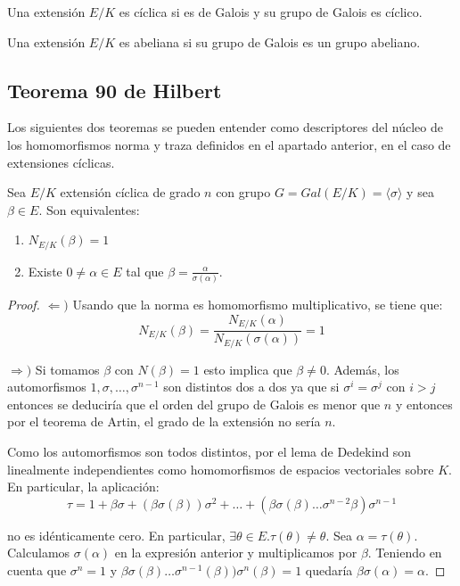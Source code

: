\begin{definition}
Una extensión $E/K$ es cíclica si es de Galois y su grupo de Galois es cíclico.

Una extensión $E/K$ es abeliana si su grupo de Galois es un grupo abeliano.  
\end{definition}

\subsection{Teorema 90 de Hilbert}

Los siguientes dos teoremas se pueden entender como descriptores del núcleo de los homomorfismos norma y traza definidos en el apartado anterior, en el caso de extensiones cíclicas. 

\begin{theorem}
Sea $E/K$ extensión cíclica de grado $n$ con grupo $G = Gal(E/K) = \langle \sigma\rangle$ y
sea $\beta \in E$. Son equivalentes:

\begin{enumerate}
\item $N_{E/K}(\beta) = 1$
\item Existe $0 \neq \alpha \in E$ tal que $\beta = \frac{\alpha}{\sigma(\alpha)}$.
\end{enumerate}
\end{theorem}
\begin{proof}
$\Leftarrow)$ Usando que la norma es homomorfismo multiplicativo, se tiene que: \[
N_{E/K}(\beta) = \frac{N_{E/K}(\alpha)}{N_{E/K}(\sigma(\alpha))} = 1
\]

$\Rightarrow)$ Si tomamos $\beta$ con $N(\beta) = 1$ esto implica que $\beta \neq 0$. Además, los automorfismos $1,\sigma,\dots,\sigma^{n-1}$ son distintos dos a dos ya que si $\sigma^i = \sigma^j$ con $i > j$ entonces se deduciría que el orden del grupo de Galois es menor que $n$ y entonces por el teorema de Artin, el grado de la extensión no sería $n$. 

Como los automorfismos son todos distintos, por el lema de Dedekind son linealmente independientes como homomorfismos de espacios vectoriales sobre $K$. En particular, la aplicación: \[
\tau 
= 
1 + \beta\sigma + (\beta \sigma(\beta))\sigma^2 + 
\dots +
(\beta \sigma(\beta)\dots \sigma^{n-2}\beta) \sigma^{n-1}
\]

no es idénticamente cero. En particular, $\exists \theta \in E.\tau(\theta) \neq \theta$. Sea $\alpha = \tau(\theta)$. Calculamos $\sigma(\alpha)$ en la expresión anterior y multiplicamos por $\beta$. Teniendo en cuenta que $\sigma^n = 1$ y $\beta \sigma(\beta) \ldots \sigma^{n-1}(\beta))\sigma^n(\beta) = 1$ quedaría $\beta \sigma(\alpha) = \alpha$. 
\end{proof}

